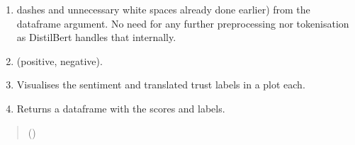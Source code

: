 \documentclass[letterpaper,10pt,english]{sphinxhowto}
\begin{document}
\begin{fulllineitems}
\label{\detokenize{_autosummary/custom_packages.modelling_modules.nlp_modelling.sentiment_analysis_using_distilbert:custom_packages.modelling_modules.nlp_modelling.sentiment_analysis_using_distilbert}}
\pysigstartsignatures
\pysiglinewithargsret
{}
{}
{}
\pysigstopsignatures\begin{enumerate}
%
\item {} \begin{description}
\sphinxAtStartPar
dashes and unnecessary white spaces already done earlier) from the dataframe argument. No need for any further
preprocessing nor tokenisation as DistilBert handles that internally.

\end{description}

\item {} \begin{description}
\sphinxAtStartPar
(positive, negative).

\end{description}

\item {} 
\sphinxAtStartPar
Visualises the sentiment and translated trust labels in a plot each.

\item {} 
\sphinxAtStartPar
Returns a dataframe with the scores and labels.

\end{enumerate}
\begin{quote}\begin{description}
\sphinxAtStartPar
{} ()

\sphinxAtStartPar
{}

\end{description}\end{quote}

\end{fulllineitems}
\end{document}
